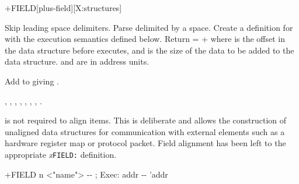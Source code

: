 
\begin{worddef}{}{+FIELD}[plus-field][X:structures]
\item {}

	Skip leading space delimiters.  Parse  delimited
	by a space.  Create a definition for  with the
	execution semantics defined below.  Return  =
	 +  where  is the offset
	in the data structure before  executes, and
	 is the size of the data to be added to the data
	structure.  and  are in address units.

\execute[name]

	Add  to  giving .

\see {},
	,
	,
	,
	,
	,
	,
	.

	\begin{rationale} %
		 is not required to align items.  This is
		deliberate and allows the construction of unaligned data
		structures for communication with external elements such
		as a hardware register map or protocol packet.
		Field alignment has been left to the appropriate
		\emph{x}\texttt{FIELD:} definition.
	\end{rationale}

	\begin{implement} %

		\word{:} +FIELD\tab{} n <"name"> -{}- ; Exec: addr -{}- 'addr \\
		\tab {}  \word{,} \word{+} \\
		\tab {}  \word{+} \\
		\word{;}
	\end{implement}
\end{worddef}


